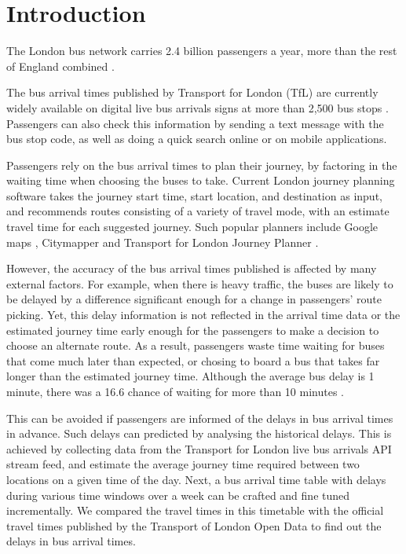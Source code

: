 \chapter{Introduction}

The London bus network carries 2.4 billion passengers a year, more than the rest of England combined \cite{tfl_annual_report_13/14}.

\par The bus arrival times published by Transport for London (TfL) are currently widely available on digital live bus arrivals signs at more than 2,500 bus stops \cite{live_bus_arrivals}. Passengers can also check this information by sending a text message with the bus stop code, as well as doing a quick search online or on mobile applications.

\par Passengers rely on the bus arrival times to plan their journey, by factoring in the waiting time when choosing the buses to take. Current London journey planning software takes the journey start time, start location, and destination as input, and recommends routes consisting of a variety of travel mode, with an estimate travel time for each suggested journey. Such popular planners include Google maps \cite{google_maps}, Citymapper \cite{citymapper} and Transport for London Journey Planner \cite{tfl_journey_planner}.

\par However, the accuracy of the bus arrival times published is affected by many external factors. For example, when there is heavy traffic, the buses are likely to be delayed by a difference significant enough for a change in passengers' route picking. Yet, this delay information is not reflected in the arrival time data or the estimated journey time early enough for the passengers to make a decision to choose an alternate route. As a result, passengers waste time waiting for buses that come much later than expected, or chosing to board a bus that takes far longer than the estimated journey time. Although the average bus delay is 1 minute, there was a 16.6 chance of waiting for more than 10 minutes \cite{buses_performance_data}.

\par This can be avoided if passengers are informed of the delays in bus arrival times in advance. Such delays can predicted by analysing the historical delays. This is achieved by collecting data from the Transport for London live bus arrivals API stream feed\cite{live_bus_arrivals}, and estimate the average journey time required between two locations on a given time of the day. Next, a bus arrival time table with delays during various time windows over a week can be crafted and fine tuned incrementally. We compared the travel times in this timetable with the official travel times published by the Transport of London Open Data to find out the delays in bus arrival times.
